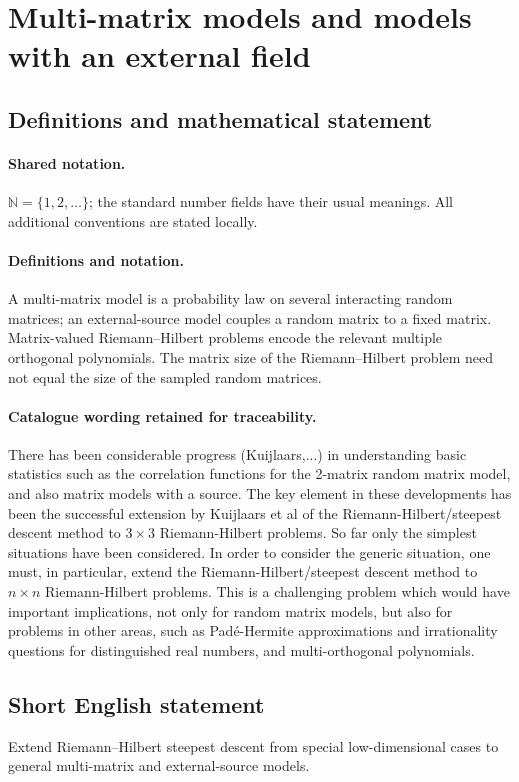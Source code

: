 \documentclass[11pt]{article}
\begin{document}
\section{Multi-matrix models and models with an external field}\label{statement}

\subsection{Definitions and mathematical statement}

\paragraph{Shared notation.}$\mathbb N=\{1,2,\ldots\}$; the standard number fields have their usual meanings. All additional conventions are stated locally.


\paragraph{Definitions and notation.}A multi-matrix model is a probability law on several interacting random matrices; an external-source model couples a random matrix to a fixed matrix. Matrix-valued Riemann--Hilbert problems encode the relevant multiple orthogonal polynomials. The matrix size of the Riemann--Hilbert problem need not equal the size of the sampled random matrices.

\paragraph{Catalogue wording retained for traceability.}
There has been considerable progress (Kuijlaars,...) in understanding basic statistics such as the correlation functions for the 2-matrix random matrix model, and also matrix models with a source. The key element in these developments has been the successful extension by Kuijlaars et al of the Riemann-Hilbert/steepest descent method to $3\times3$ Riemann-Hilbert problems. So far only the simplest situations have been considered. In order to consider the generic situation, one must, in particular, extend the Riemann-Hilbert/steepest descent method to $n\times n$ Riemann-Hilbert problems. This is a challenging problem which would have important implications, not only for random matrix models, but also for problems in other areas, such as Pad\'e-Hermite approximations and irrationality questions for distinguished real numbers, and multi-orthogonal polynomials.
\subsection{Short English statement}
Extend Riemann--Hilbert steepest descent from special low-dimensional cases to general multi-matrix and external-source models.
\end{document}
